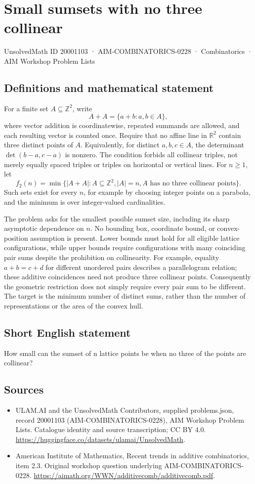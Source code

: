 \documentclass[11pt,a4paper]{article}
\begin{document}
\section*{Small sumsets with no three collinear}\label{20001103}
{\small UnsolvedMath ID 20001103 · AIM-COMBINATORICS-0228 · Combinatorics · AIM Workshop Problem Lists}
\subsection{Definitions and mathematical statement}
For a finite set $A\subseteq\mathbb Z^2$, write
\[
                        A+A=\{a+b:a,b\in A\},
\]
where vector addition is coordinatewise, repeated summands are allowed,
and each resulting vector is counted once. Require that no affine
line in $\mathbb R^2$ contain three distinct points of $A$.
Equivalently, for distinct $a,b,c\in A$, the determinant
$\det(b-a,c-a)$ is nonzero. The condition forbids all collinear
triples, not merely equally spaced triples or triples on horizontal
or vertical lines.
For $n\ge1$, let
\[
 f_2(n)=\min\{|A+A|:A\subseteq\mathbb Z^2, |A|=n,
                                  A\text{ has no three collinear points}\}.
\]
Such sets exist for every $n$, for example by choosing integer points
on a parabola, and the minimum is over integer-valued cardinalities.

The problem asks for the smallest possible sumset size, including its
sharp asymptotic dependence on $n$. No bounding box, coordinate bound,
or convex-position assumption is present. Lower bounds must hold for
all eligible lattice configurations, while upper bounds require
configurations with many coinciding pair sums despite the prohibition
on collinearity.
For example, equality $a+b=c+d$ for different unordered pairs describes
a parallelogram relation; these additive coincidences need not produce
three collinear points. Consequently the geometric restriction does
not simply require every pair sum to be different. The target is the
minimum number of distinct sums, rather than the number of representations
or the area of the convex hull.
\subsection{Short English statement}
How small can the sumset of n lattice points be when no three of the points are collinear?
\subsection{Sources}
\begin{itemize}
\item[S1] ULAM.AI and the UnsolvedMath Contributors, supplied problems.json, record 20001103 (AIM-COMBINATORICS-0228), AIM Workshop Problem Lists. Catalogue identity and source transcription; CC BY 4.0.
\url{https://huggingface.co/datasets/ulamai/UnsolvedMath}.
\item[S2] American Institute of Mathematics, Recent trends in additive combinatorics, item 2.3. Original workshop question underlying AIM-COMBINATORICS-0228.
\url{https://aimath.org/WWN/additivecomb/additivecomb.pdf}.
\end{itemize}
\end{document}
